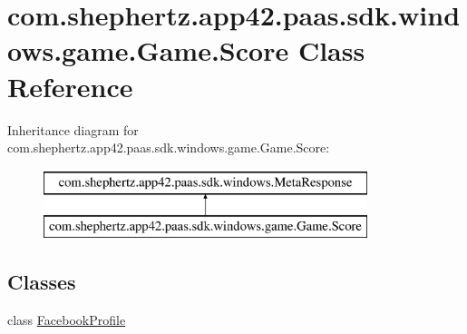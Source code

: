 \hypertarget{classcom_1_1shephertz_1_1app42_1_1paas_1_1sdk_1_1windows_1_1game_1_1_game_1_1_score}{\section{com.\+shephertz.\+app42.\+paas.\+sdk.\+windows.\+game.\+Game.\+Score Class Reference}
\label{classcom_1_1shephertz_1_1app42_1_1paas_1_1sdk_1_1windows_1_1game_1_1_game_1_1_score}
}
Inheritance diagram for com.\+shephertz.\+app42.\+paas.\+sdk.\+windows.\+game.\+Game.\+Score\+:\begin{figure}[H]
\begin{center}
\leavevmode
\includegraphics[height=2.000000cm]{classcom_1_1shephertz_1_1app42_1_1paas_1_1sdk_1_1windows_1_1game_1_1_game_1_1_score}
\end{center}
\end{figure}
\subsection*{Classes}
\begin{DoxyCompactItemize}
\item 
class \hyperlink{classcom_1_1shephertz_1_1app42_1_1paas_1_1sdk_1_1windows_1_1game_1_1_game_1_1_score_1_1_facebook_profile}{Facebook\+Profile}
\end{DoxyCompactItemize}
